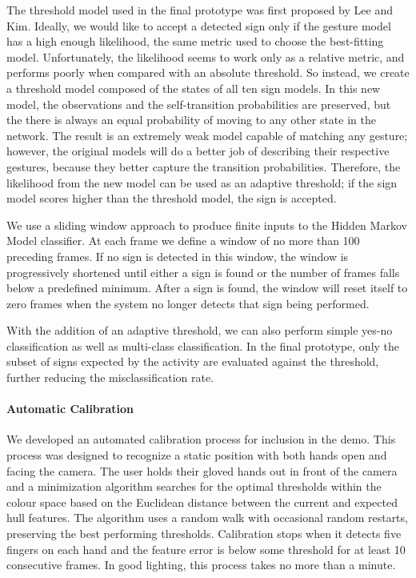 \documentclass[12pt]{article}
\begin{document}
The threshold model used in the final prototype was first proposed by Lee and Kim\cite{LeeKim}. Ideally, we would like to accept a detected sign only if the gesture model has a high enough likelihood, the same metric used to choose the best-fitting model. Unfortunately, the likelihood seems to work only as a relative metric, and performs poorly when compared with an absolute threshold. So instead, we create a threshold model composed of the states of all ten sign models. In this new model, the observations and the self-transition probabilities are preserved, but the there is always an equal probability of moving to any other state in the network. The result is an extremely weak model capable of matching any gesture; however, the original models will do a better job of describing their respective gestures, because they better capture the transition probabilities. Therefore, the likelihood from the new model can be used as an adaptive threshold; if the sign model scores higher than the threshold model, the sign is accepted. 

We use a sliding window approach to produce finite inputs to the Hidden Markov Model classifier. At each frame we define a window of no more than 100 preceding frames. If no sign is detected in this window, the window is progressively shortened until either a sign is found or the number of frames falls below a predefined minimum. After a sign is found, the window will reset itself to zero frames when the system no longer detects that sign being performed.

With the addition of an adaptive threshold, we can also perform simple yes-no classification as well as multi-class classification. In the final prototype, only the subset of signs expected by the activity are evaluated against the threshold, further reducing the misclassification rate.

\paragraph{Automatic Calibration}
We developed an automated calibration process for inclusion in the demo. This process was designed to recognize a static position with both hands open and facing the camera.  The user holds their gloved hands out in front of the camera and a minimization algorithm searches for the optimal thresholds within the colour space based on the Euclidean distance between the current and expected hull features. The algorithm uses a random walk with occasional random restarts, preserving the best performing thresholds. Calibration stops when it detects five fingers on each hand and the feature error is below some threshold for at least 10 consecutive frames. In good lighting, this process takes no more than a minute.
\end{document}
